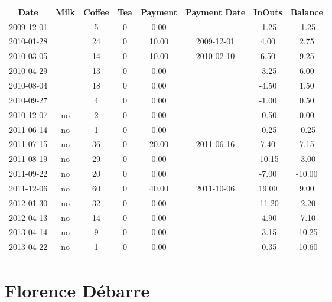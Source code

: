 \begin{center}
\begin{tabular}{cccccccc}
\textbf{Date} & \textbf{Milk} & \textbf{Coffee} & \textbf{Tea} & \textbf{Payment} & \textbf{Payment Date} & \textbf{InOuts} & \textbf{Balance} \\
2009-12-01 &  &  5 & 0 &  0.00 &  &  -1.25 &  -1.25\\ 
2010-01-28 &  & 24 & 0 & 10.00 & 2009-12-01 &   4.00 &   2.75\\ 
2010-03-05 &  & 14 & 0 & 10.00 & 2010-02-10 &   6.50 &   9.25\\ 
2010-04-29 &  & 13 & 0 &  0.00 &  &  -3.25 &   6.00\\ 
2010-08-04 &  & 18 & 0 &  0.00 &  &  -4.50 &   1.50\\ 
2010-09-27 &  &  4 & 0 &  0.00 &  &  -1.00 &   0.50\\ 
2010-12-07 & no &  2 & 0 &  0.00 &  &  -0.50 &   0.00\\ 
2011-06-14 & no &  1 & 0 &  0.00 &  &  -0.25 &  -0.25\\ 
2011-07-15 & no & 36 & 0 & 20.00 & 2011-06-16 &   7.40 &   7.15\\ 
2011-08-19 & no & 29 & 0 &  0.00 &  & -10.15 &  -3.00\\ 
2011-09-22 & no & 20 & 0 &  0.00 &  &  -7.00 & -10.00\\ 
2011-12-06 & no & 60 & 0 & 40.00 & 2011-10-06 &  19.00 &   9.00\\ 
2012-01-30 & no & 32 & 0 &  0.00 &  & -11.20 &  -2.20\\ 
2012-04-13 & no & 14 & 0 &  0.00 &  &  -4.90 &  -7.10\\ 
2013-04-14 & no &  9 & 0 &  0.00 &  &  -3.15 & -10.25\\ 
2013-04-22 & no &  1 & 0 &  0.00 &  &  -0.35 & -10.60
\end{tabular}
\end{center}

\section{Florence D\'ebarre}

